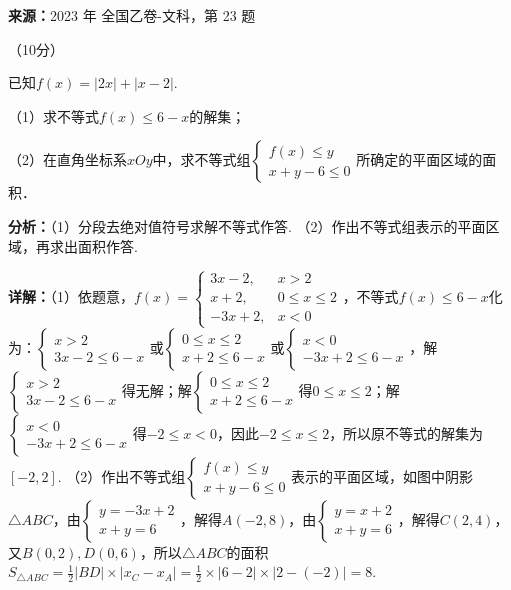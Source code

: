 \begin{question}[points=10]
\textbf{来源：}2023 年 全国乙卷-文科，第 23 题\par
[选修4-5]（10分）

已知$f(x)=|2x|+|x-2|$.

（1）求不等式$f(x)\le6-x$的解集；

（2）在直角坐标系$xOy$中，求不等式组$\begin{cases}f(x)\le y\\x+y-6\le0\end{cases}$所确定的平面区域的面积．
\begin{solution}

\textbf{分析：}（1）分段去绝对值符号求解不等式作答.
（2）作出不等式组表示的平面区域，再求出面积作答.

\textbf{详解：}（1）依题意，$f(x)=\begin{cases}3x-2, & x>2\\x+2, & 0\le x\le2\\-3x+2, & x<0\end{cases}$，不等式$f(x)\le6-x$化为：$\begin{cases}x>2\\3x-2\le6-x\end{cases}$或$\begin{cases}0\le x\le2\\x+2\le6-x\end{cases}$或$\begin{cases}x<0\\-3x+2\le6-x\end{cases}$，解$\begin{cases}x>2\\3x-2\le6-x\end{cases}$得无解；解$\begin{cases}0\le x\le2\\x+2\le6-x\end{cases}$得$0\le x\le2$；解$\begin{cases}x<0\\-3x+2\le6-x\end{cases}$得$-2\le x<0$，因此$-2\le x\le2$，所以原不等式的解集为$[-2,2]$.
（2）作出不等式组$\begin{cases}f(x)\le y\\x+y-6\le0\end{cases}$表示的平面区域，如图中阴影$\triangle ABC$，由$\begin{cases}y=-3x+2\\x+y=6\end{cases}$，解得$A(-2,8)$，由$\begin{cases}y=x+2\\x+y=6\end{cases}$，解得$C(2,4)$，又$B(0,2), D(0,6)$，所以$\triangle ABC$的面积$S_{\triangle ABC}=\frac{1}{2}|BD|\times|x_C-x_A|=\frac{1}{2}\times|6-2|\times|2-(-2)|=8$.
\end{solution}
\end{question}

